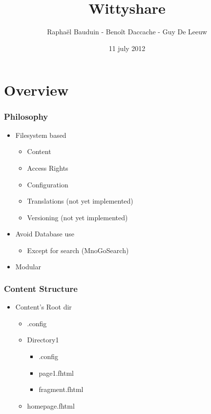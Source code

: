 \documentclass[]{beamer}
\title{Wittyshare}
\author{Rapha\"el Bauduin - Beno\^it Daccache - Guy De Leeuw}
\date{11 july 2012}
\begin{document}

\begin{frame}
 \titlepage
\end{frame}

\begin{frame}
 \tableofcontents
\end{frame}


\section{Overview}

\begin{frame}
\frametitle{Philosophy}
\begin{itemize}
  \item Filesystem based
    \begin{itemize}
      \item Content
      \item Access Rights
      \item Configuration
      \item Translations (not yet implemented)
      \item Versioning   (not yet implemented)
    \end{itemize}
  \item Avoid Database use
    \begin{itemize}
      \item Except for search (MnoGoSearch)
    \end{itemize}
  \item Modular
\end{itemize}
\end{frame}


\begin{frame}
\frametitle{Content Structure}
\begin{itemize}
  \item Content's Root dir
    \begin{itemize}
      \item .config
      \item Directory1
        \begin{itemize}
          \item .config
          \item page1.fhtml
          \item fragment.fhtml
        \end{itemize}
      \item homepage.fhtml
    \end{itemize}
\end{itemize}
\end{frame}
\end{document}
